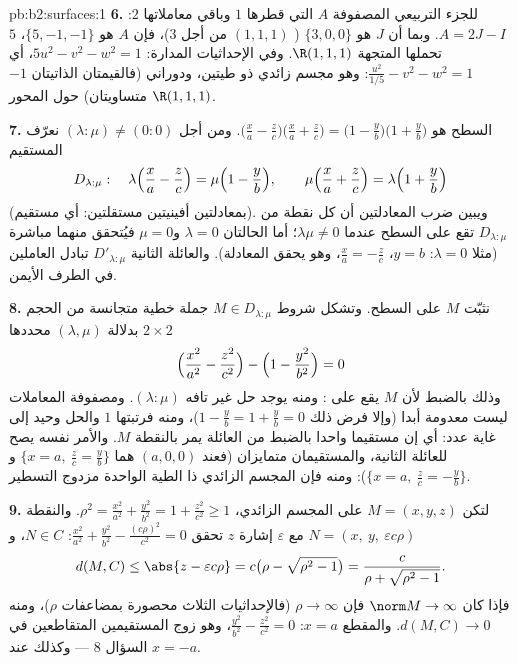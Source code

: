\begin{solution}{pb:b2:surfaces:1}
\textbf{6.} للجزء التربيعي المصفوفة $A$ التي قطرها $1$ وباقي
معاملاتها $2$: $A = 2J - I$. وبما أن  $J$ هو $\{3, 0, 0\}$ ( $(1,1,1)$ من أجل $3$)، فإن  $A$ هو $\{5, -1, -1\}$،  $5$ تحملها المتجهة $\R(1,1,1)$. وفي الإحداثيات المدارة: $5u^2 - v^2 - w^2 =
1$،
أي $\frac{u^2}{1/5} - v^2 - w^2 = 1$: وهو مجسم زائدي ذو طيتين، ودوراني (فالقيمتان الذاتيتان
$-1$ متساويتان) حول المحور $\R(1,1,1)$.

\textbf{7.} السطح هو $\bigl(\frac xa - \frac
zc\bigr)\bigl(\frac xa + \frac zc\bigr) = \bigl(1 - \frac
yb\bigr)\bigl(1 + \frac yb\bigr)$. ومن أجل $(\lambda : \mu) \neq
(0:0)$ نعرّف المستقيم
\[
D_{\lambda:\mu} :\quad
\lambda\Bigl(\frac xa - \frac zc\Bigr) = \mu\Bigl(1 - \frac
yb\Bigr), \qquad
\mu\Bigl(\frac xa + \frac zc\Bigr) = \lambda\Bigl(1 + \frac
yb\Bigr)
\]
(بمعادلتين أفينيتين مستقلتين: أي مستقيم). ويبين ضرب المعادلتين أن
كل نقطة من $D_{\lambda:\mu}$ تقع على السطح عندما $\lambda\mu \neq 0$؛ أما الحالتان $\lambda = 0$
و$\mu = 0$ فيُتحقق منهما مباشرة (مثلا $\lambda = 0$: $y =
b$، $\frac xa = -\frac zc$، وهو
يحقق المعادلة). والعائلة الثانية $D'_{\lambda:\mu}$ تبادل العاملين في الطرف
الأيمن.

\textbf{8.} نثبّت $M$ على السطح. وتشكل شروط $M \in
D_{\lambda:\mu}$ جملة خطية
متجانسة من الحجم $2\times2$ بدلالة $(\lambda, \mu)$ محددها
\[
\Bigl(\frac{x^2}{a^2} - \frac{z^2}{c^2}\Bigr) - \Bigl(1 -
\frac{y^2}{b^2}\Bigr) = 0
\]
وذلك بالضبط لأن $M$ يقع على : ومنه يوجد
حل غير تافه $(\lambda : \mu)$. ومصفوفة المعاملات ليست معدومة أبدا (وإلا فرض
ذلك $1 - \frac yb = 1 + \frac yb =
0$)، ومنه فرتبتها $1$ والحل وحيد إلى غاية عدد: أي إن
مستقيما واحدا بالضبط من العائلة يمر بالنقطة $M$. والأمر نفسه
يصح للعائلة الثانية، والمستقيمان متمايزان (فعند $(a, 0, 0)$ هما $\{x = a,\ \frac zc = \frac
yb\}$
و$\{x = a,\ \frac zc = -\frac yb\}$): ومنه فإن المجسم الزائدي ذا الطية الواحدة مزدوج التسطير.

\textbf{9.} لتكن $M = (x, y, z)$ على المجسم الزائدي، $\rho^2 =
\frac{x^2}{a^2} + \frac{y^2}{b^2} = 1 + \frac{z^2}{c^2} \geq
1$. والنقطة $N = (x,\ y,\ \varepsilon c\rho)$
مع $\varepsilon$ إشارة $z$ تحقق $\frac{x^2}{a^2} +
\frac{y^2}{b^2} - \frac{(c\rho)^2}{c^2} = 0$: $N \in C$، و
\[
d(M, C) \leq \abs{z - \varepsilon c\rho}
= c\bigl(\rho - \sqrt{\rho^2 - 1}\bigr)
= \frac{c}{\rho + \sqrt{\rho^2 - 1}} .
\]
فإذا كان $\norm M \to \infty$ فإن $\rho \to \infty$ (فالإحداثيات الثلاث محصورة بمضاعفات
$\rho$)، ومنه $d(M, C)
\to 0$. والمقطع $x = a$: $\frac{y^2}{b^2} -
\frac{z^2}{c^2} = 0$، وهو زوج المستقيمين
المتقاطعين في السؤال 8 --- وكذلك عند $x = -a$.


\end{solution}
